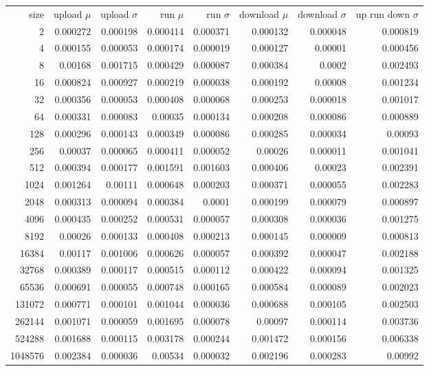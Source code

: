 \begin{tabular}{r r r r r r r r}
size & upload $\mu$  & upload $\sigma$ & run $\mu$ & run $\sigma$ & download $\mu$ & download $\sigma$ & up run down $\sigma$ \\
2 & 0.000272 & 0.000198 & 0.000414 & 0.000371 & 0.000132 & 0.000048 & 0.000819 \\
4 & 0.000155 & 0.000053 & 0.000174 & 0.000019 & 0.000127 & 0.00001 & 0.000456 \\
8 & 0.00168 & 0.001715 & 0.000429 & 0.000087 & 0.000384 & 0.0002 & 0.002493 \\
16 & 0.000824 & 0.000927 & 0.000219 & 0.000038 & 0.000192 & 0.00008 & 0.001234 \\
32 & 0.000356 & 0.000053 & 0.000408 & 0.000068 & 0.000253 & 0.000018 & 0.001017 \\
64 & 0.000331 & 0.000083 & 0.00035 & 0.000134 & 0.000208 & 0.000086 & 0.000889 \\
128 & 0.000296 & 0.000143 & 0.000349 & 0.000086 & 0.000285 & 0.000034 & 0.00093 \\
256 & 0.00037 & 0.000065 & 0.000411 & 0.000052 & 0.00026 & 0.000011 & 0.001041 \\
512 & 0.000394 & 0.000177 & 0.001591 & 0.001603 & 0.000406 & 0.00023 & 0.002391 \\
1024 & 0.001264 & 0.00111 & 0.000648 & 0.000203 & 0.000371 & 0.000055 & 0.002283 \\
2048 & 0.000313 & 0.000094 & 0.000384 & 0.0001 & 0.000199 & 0.000079 & 0.000897 \\
4096 & 0.000435 & 0.000252 & 0.000531 & 0.000057 & 0.000308 & 0.000036 & 0.001275 \\
8192 & 0.00026 & 0.000133 & 0.000408 & 0.000213 & 0.000145 & 0.000009 & 0.000813 \\
16384 & 0.00117 & 0.001006 & 0.000626 & 0.000057 & 0.000392 & 0.000047 & 0.002188 \\
32768 & 0.000389 & 0.000117 & 0.000515 & 0.000112 & 0.000422 & 0.000094 & 0.001325 \\
65536 & 0.000691 & 0.000055 & 0.000748 & 0.000165 & 0.000584 & 0.000089 & 0.002023 \\
131072 & 0.000771 & 0.000101 & 0.001044 & 0.000036 & 0.000688 & 0.000105 & 0.002503 \\
262144 & 0.001071 & 0.000059 & 0.001695 & 0.000078 & 0.00097 & 0.000114 & 0.003736 \\
524288 & 0.001688 & 0.000115 & 0.003178 & 0.000244 & 0.001472 & 0.000156 & 0.006338 \\
1048576 & 0.002384 & 0.000036 & 0.00534 & 0.000032 & 0.002196 & 0.000283 & 0.00992 \\

\end{tabular}
